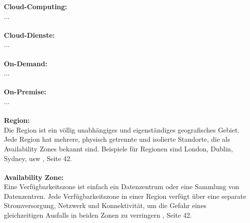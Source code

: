 

\textbf{Cloud-Computing:}\\
...
\\\\
\textbf{Cloud-Dienste:}\\
...
\\\\
\textbf{On-Demand:}\\
...
\\\\
\textbf{On-Premise:}\\
...
\\\\
\textbf{Region:}\\
Die Region ist ein völlig unabhängiges und eigenständiges geografisches Gebiet. Jede Region hat mehrere, physisch getrennte und isolierte Standorte, die als Availability Zones bekannt sind. Beispiele für Regionen sind London, Dublin, Sydney, usw {\cite{AWS1}}, Seite 42.
\\\\
\textbf{Availability Zone:}\\
Eine Verfügbarkeitszone ist einfach ein Datenzentrum oder eine Sammlung von Datenzentren. Jede Verfügbarkeitszone in einer Region verfügt über eine separate Stromversorgung, Netzwerk und Konnektivität, um die Gefahr eines gleichzeitigen Ausfalls in beiden Zonen zu verringern {\cite{AWS1}}, Seite 42.
\\\\

